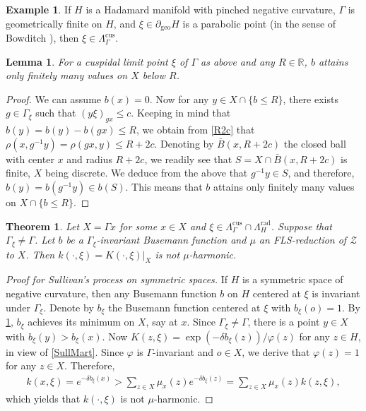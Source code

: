 \documentclass[12pt,a4paper]{amsart}
\numberwithin{equation}{section}
\newtheorem{lem}[equation]{Lemma}
\newtheorem{thm}[equation]{Theorem}
\theoremstyle{definition}
\newtheorem{exa}[equation]{Example}
\DeclareMathOperator{\cus}{cus}
\DeclareMathOperator{\geo}{geo}
\DeclareMathOperator{\rad}{rad}
\def\R{\mathbb R}
\def\vf{\varphi}
\begin{document}
\begin{exa}\label{exaculipo}
If $H$ is a Hadamard manifold with pinched negative  curvature, $\Gamma$ is geometrically finite on $H$, and $\xi\in\partial_{\geo}H$ is a parabolic point (in the sense of Bowditch \cite{Bo}), then $\xi\in\Lambda_\Gamma^{\cus}$.
\end{exa}

\begin{lem}\label{coco}
For a cuspidal limit point $\xi$ of $\Gamma$ as above and any $R\in\R$, $b$ attains only finitely many values on $X$ below $R$.
\end{lem}

\begin{proof}
We can assume $b(x)=0$.
Now for any $y\in X \cap \{ b\le R\}$, there exists $g\in\Gamma_\xi$ such that $(y\xi)_{gx}\le c$.
Keeping in mind that $b(y)=b(y)-b(gx) \leq R$, we obtain from \cref{R2c} that $\rho(x,g^{-1}y) = \rho(gx,y) \le R  + 2c$. Denoting by $\bar{B}(x,R + 2c)$ the closed ball with center $x$ and radius $R+2c$, we readily see that $S = X \cap \bar{B}(x,R + 2c)$ is finite, $X$ being discrete. We deduce from the above that $g^{-1} y \in S$, and therefore, $b(y) = b(g^{-1}y) \in b(S)$. This means that $b$ attains only finitely many values on $X \cap \{  b \leq R\}$.
\end{proof}

\begin{thm}\label{nonharm}
Let $X=\Gamma x$ for some $x\in X$ and $\xi\in\Lambda_\Gamma^{\cus}\cap\Lambda_H^{\rad}$.
Suppose that $\Gamma_\xi\ne\Gamma$.
Let $b$ be a $\Gamma_\xi$-invariant Busemann function and $\mu$ an FLS-reduction of $\mathcal{Z}$ to $X$.
Then $k(\cdot,\xi)=K(\cdot,\xi)|_X$ is not $\mu$-harmonic.
\end{thm}

\begin{proof}[Proof for Sullivan's process on symmetric spaces]
If $H$ is a symmetric space of negative  curvature, then any Busemann function $b$ on $H$ centered at $\xi$ is invariant under $\Gamma_\xi$.
Denote by $b_\xi$ the Busemann function centered at $\xi$ with $b_\xi(o) = 1$.
By \cref{coco}, $b_\xi$ achieves its minimum on $X$, say at $x$.
Since $\Gamma_\xi\ne\Gamma$, there is a point $y\in X$ with $b_\xi(y)>b_\xi(x)$.
Now $K(z,\xi) = \exp(-\delta b_\xi(z))/\vf(z)$ for any $z \in H$, in view of \cref{SullMart}.
Since $\vf$ is $\Gamma$-invariant and $o \in X$, we derive that $\vf(z) = 1$ for any $z \in X$. Therefore,
\begin{align*}
    k(x,\xi) = e^{-\delta b_\xi(x)} > \sum_{z\in X}\mu_x(z)e^{-\delta b_\xi(z)} = \sum_{z\in X}\mu_x(z)k(z,\xi),
\end{align*}
which yields that $k(\cdot,\xi)$ is not $\mu$-harmonic.
\end{proof}
\end{document}
